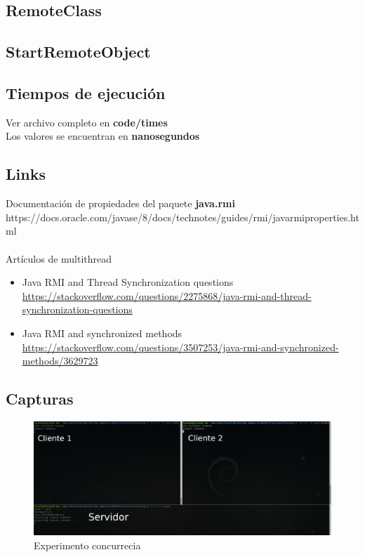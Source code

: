 \documentclass[12pt,journal,compsoc]{IEEEtran}
\begin{document}
\subsection{RemoteClass}
\label{section:RemoteClass}


\subsection{StartRemoteObject}
\label{section:StartRemoteObject}


\subsection{Tiempos de ejecución}
Ver archivo completo en \textbf{code/times}\\
Los valores se encuentran en \textbf{nanosegundos}
\label{section:times}


\subsection{Links}
\label{section:links}
Documentación de propiedades del paquete \textbf{java.rmi}\\
https://docs.oracle.com/javase/8/docs/technotes/guides/rmi/javarmiproperties.html\\\\
Artículos de multithread
\begin{itemize}
  \item Java RMI and Thread Synchronization questions\\\url{https://stackoverflow.com/questions/2275868/java-rmi-and-thread-synchronization-questions}
  \item Java RMI and synchronized methods\\\url{https://stackoverflow.com/questions/3507253/java-rmi-and-synchronized-methods/3629723}
\end{itemize}

\subsection{Capturas}
\label{section:capturas}
\begin{figure}[H]
  \centering
  \includegraphics[width=180mm]{capturas/concurrencia.png}
  \caption{Experimento concurrecia}
  \label{fig:concurrecia}
\end{figure}

\ifCLASSOPTIONcaptionsoff
  \newpage
\fi
\end{document}
